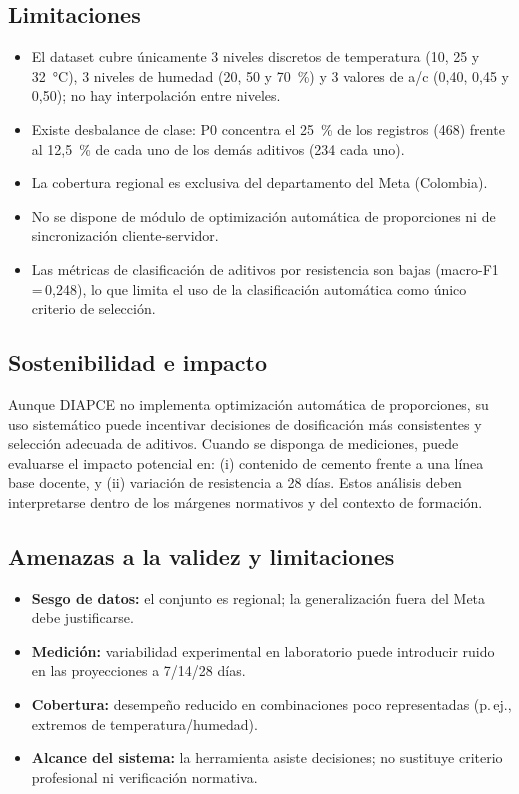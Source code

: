 \subsection{Limitaciones}

\begin{itemize}
  \item El dataset cubre únicamente 3 niveles discretos de temperatura (10, 25 y 32~°C), 3 niveles de humedad (20, 50 y 70~\%) y 3 valores de a/c (0{,}40, 0{,}45 y 0{,}50); no hay interpolación entre niveles.
  \item Existe desbalance de clase: P0 concentra el 25~\% de los registros (468) frente al 12{,}5~\% de cada uno de los demás aditivos (234 cada uno).
  \item La cobertura regional es exclusiva del departamento del Meta (Colombia).
  \item No se dispone de módulo de optimización automática de proporciones ni de sincronización cliente-servidor.
  \item Las métricas de clasificación de aditivos por resistencia son bajas (macro-F1\,=\,0{,}248), lo que limita el uso de la clasificación automática como único criterio de selección.
\end{itemize}

\subsection{Sostenibilidad e impacto}

Aunque DIAPCE no implementa optimización automática de proporciones, su uso sistemático puede incentivar decisiones de dosificación más consistentes y selección adecuada de aditivos. Cuando se disponga de mediciones, puede evaluarse el impacto potencial en: (i) contenido de cemento frente a una línea base docente, y (ii) variación de resistencia a 28 días. Estos análisis deben interpretarse dentro de los márgenes normativos y del contexto de formación.

\subsection{Amenazas a la validez y limitaciones}

\begin{itemize}
  \item \textbf{Sesgo de datos:} el conjunto es regional; la generalización fuera del Meta debe justificarse.
  \item \textbf{Medición:} variabilidad experimental en laboratorio puede introducir ruido en las proyecciones a 7/14/28 días.
  \item \textbf{Cobertura:} desempeño reducido en combinaciones poco representadas (p.\,ej., extremos de temperatura/humedad).
  \item \textbf{Alcance del sistema:} la herramienta asiste decisiones; no sustituye criterio profesional ni verificación normativa.
\end{itemize}

